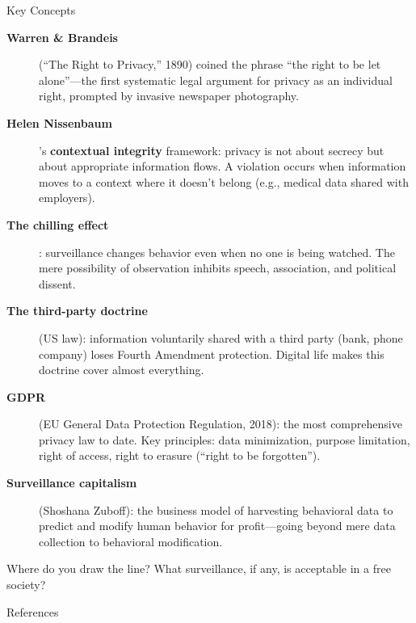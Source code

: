 ﻿\documentclass[aspectratio=169,11pt]{beamer}
\begin{document}
\begin{frame}[allowframebreaks]{Key Concepts}
\footnotesize
\begin{description}
    \item[\textbf{Warren \& Brandeis}] (``The Right to Privacy,'' 1890) coined the phrase ``the right to be let alone''---the first systematic legal argument for privacy as an individual right, prompted by invasive newspaper photography.
    \item[\textbf{Helen Nissenbaum}]'s \textbf{contextual integrity} framework: privacy is not about secrecy but about appropriate information flows. A violation occurs when information moves to a context where it doesn't belong (e.g., medical data shared with employers).
    \item[\textbf{The chilling effect}]: surveillance changes behavior even when no one is being watched. The mere possibility of observation inhibits speech, association, and political dissent.
    \item[\textbf{The third-party doctrine}] (US law): information voluntarily shared with a third party (bank, phone company) loses Fourth Amendment protection. Digital life makes this doctrine cover almost everything.
    \item[\textbf{GDPR}] (EU General Data Protection Regulation, 2018): the most comprehensive privacy law to date. Key principles: data minimization, purpose limitation, right of access, right to erasure (``right to be forgotten'').
    \item[\textbf{Surveillance capitalism}] (Shoshana Zuboff): the business model of harvesting behavioral data to predict and modify human behavior for profit---going beyond mere data collection to behavioral modification.
\end{description}

\begin{discussionbox}[Discussion]
Where do you draw the line? What surveillance, if any, is acceptable in a free society?
\end{discussionbox}
\end{frame}

\begin{frame}[allowframebreaks]{References}
\printbibliography[heading=none]
\end{frame}
\end{document}
